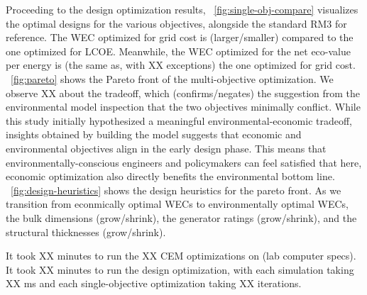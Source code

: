 \documentclass[10pt,twoside]{article}
\begin{document}
Proceeding to the design optimization results, \figureautorefname~\ref{fig:single-obj-compare} visualizes the optimal designs for the various objectives, alongside the standard RM3 for reference.
The WEC optimized for grid cost is (larger/smaller) compared to the one optimized for LCOE.
Meanwhile, the WEC optimized for the net eco-value per energy is (the same as, with XX exceptions) the one optimized for grid cost.
\figureautorefname~\ref{fig:pareto} shows the Pareto front of the multi-objective optimization.
We observe XX about the tradeoff, which (confirms/negates) the suggestion from the environmental model inspection that the two objectives minimally conflict.
While this study initially hypothesized a meaningful environmental-economic tradeoff, insights obtained by building the model suggests that economic and environmental objectives align in the early design phase.
This means that environmentally-conscious engineers and policymakers can feel satisfied that here, economic optimization also directly benefits the environmental bottom line.
\figureautorefname~\ref{fig:design-heuristics} shows the design heuristics for the pareto front.
As we transition from econmically optimal WECs to environmentally optimal WECs, the bulk dimensions (grow/shrink), the generator ratings (grow/shrink), and the structural thicknesses (grow/shrink).

It took XX minutes to run the XX CEM optimizations on (lab computer specs).
It took XX minutes to run the design optimization, with each simulation taking XX ms and each single-objective optimization taking XX iterations.
\end{document}
